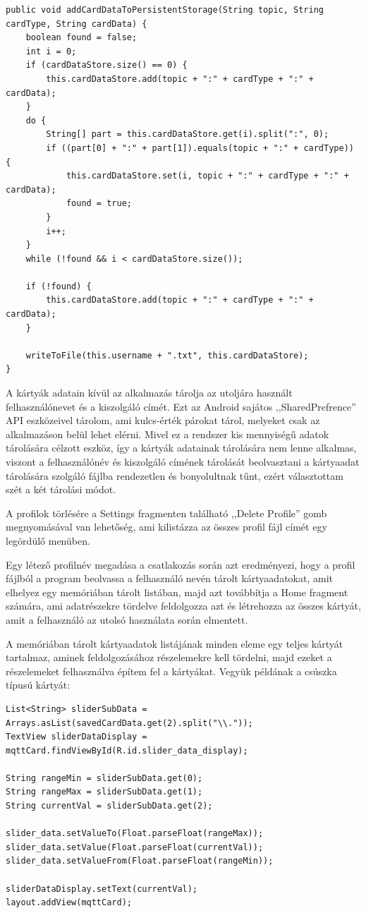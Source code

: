 \documentclass[
]{thesis-ekf}
\theoremstyle{definition}
\theoremstyle{remark}
\begin{document}
\lstset{language=Java}  
\begin{lstlisting}[frame=single]
public void addCardDataToPersistentStorage(String topic, String cardType, String cardData) {
	boolean found = false;
	int i = 0;
	if (cardDataStore.size() == 0) {
		this.cardDataStore.add(topic + ":" + cardType + ":" + cardData);
	}
	do {
		String[] part = this.cardDataStore.get(i).split(":", 0);
		if ((part[0] + ":" + part[1]).equals(topic + ":" + cardType)) {
			this.cardDataStore.set(i, topic + ":" + cardType + ":" + cardData);
			found = true;
		}
		i++;
	}
	while (!found && i < cardDataStore.size());

	if (!found) {
		this.cardDataStore.add(topic + ":" + cardType + ":" + cardData);
	}

	writeToFile(this.username + ".txt", this.cardDataStore);
}
\end{lstlisting}

A kártyák adatain kívül az alkalmazás tárolja az utoljára használt felhasználónevet és a kiszolgáló címét.
Ezt az Android sajátos ,,SharedPrefrence'' API eszközeivel tárolom, ami kulcs-érték párokat tárol, melyeket csak az
alkalmazáson belül lehet elérni.
Mivel ez a rendszer kis mennyiségű adatok tárolására célzott eszköz, így a kártyák adatainak tárolására nem lenne
alkalmas, viszont a felhasználónév és kiszolgáló címének tárolását beolvasztani a kártyaadat tárolására szolgáló
fájlba rendezetlen és bonyolultnak tűnt, ezért választottam szét a két tárolási módot.

A profilok törlésére a Settings fragmenten található ,,Delete Profile'' gomb megnyomásával van lehetőség,
ami kilistázza az összes profil fájl címét egy legördülő menüben.

Egy létező profilnév megadása a csatlakozás során azt eredményezi, hogy a profil fájlból a program beolvassa a felhasználó nevén
tárolt kártyaadatokat, amit elhelyez egy memóriában tárolt listában, majd azt továbbítja a Home fragment számára, ami
adatrészekre tördelve feldolgozza azt és létrehozza az összes kártyát, amit a felhasználó az utolsó használata során
elmentett.

A memóriában tárolt kártyaadatok listájának minden eleme egy teljes kártyát tartalmaz, aminek feldolgozásához részelemekre
kell tördelni, majd ezeket a részelemeket felhasználva építem fel a kártyákat. Vegyük példának a csúszka típusú kártyát:

\lstset{language=Java}
\begin{lstlisting}[frame=single]
List<String> sliderSubData = Arrays.asList(savedCardData.get(2).split("\\."));
TextView sliderDataDisplay = mqttCard.findViewById(R.id.slider_data_display);

String rangeMin = sliderSubData.get(0);
String rangeMax = sliderSubData.get(1);
String currentVal = sliderSubData.get(2);

slider_data.setValueTo(Float.parseFloat(rangeMax));
slider_data.setValue(Float.parseFloat(currentVal));
slider_data.setValueFrom(Float.parseFloat(rangeMin));

sliderDataDisplay.setText(currentVal);
layout.addView(mqttCard);
\end{lstlisting}
\end{document}
